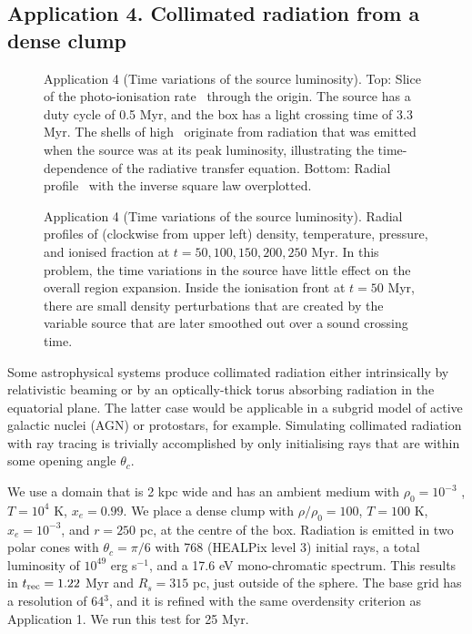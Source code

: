 \documentclass[useAMS,usenatbib]{mn2e}
\begin{document}
\subsection{Application 4. Collimated radiation from a dense clump}

\begin{figure}
  \caption{\label{fig:test12_kph} Application 4 (Time variations of the
    source luminosity).  Top: Slice of the photo-ionisation rate
    \kph~through the origin.  The source has a duty cycle of 0.5 Myr,
    and the box has a light crossing time of 3.3 Myr.  The shells of
    high \kph~originate from radiation that was emitted when the
    source was at its peak luminosity, illustrating the
    time-dependence of the radiative transfer equation.  Bottom:
    Radial profile \kph~with the inverse square law overplotted.}
\end{figure}

\begin{figure}
  \caption{\label{fig:test12_profiles} Application 4 (Time variations of the
    source luminosity).  Radial profiles of (clockwise from upper
    left) density, temperature, pressure, and ionised fraction at $t =
    50, 100, 150, 200, 250$ Myr.  In this problem, the time variations
    in the source have little effect on the overall \hii region
    expansion.  Inside the ionisation front at $t = 50$ Myr, there are
    small density perturbations that are created by the variable
    source that are later smoothed out over a sound crossing time.}
\end{figure}

Some astrophysical systems produce collimated radiation either
intrinsically by relativistic beaming or by an optically-thick torus
absorbing radiation in the equatorial plane.  The latter case would be
applicable in a subgrid model of active galactic nuclei (AGN) or
protostars, for example.  Simulating collimated radiation with ray
tracing is trivially accomplished by only initialising rays that are
within some opening angle $\theta_c$.

We use a domain that is 2 kpc wide and has an ambient medium with
$\rho_0 = 10^{-3}$ \cubecm, $T = 10^4$ K, $x_e = 0.99$.  We place a
dense clump with $\rho/\rho_0 = 100$, $T = 100$ K, $x_e = 10^{-3}$,
and $r = 250$ pc, at the centre of the box.  Radiation is emitted in
two polar cones with $\theta_c = \pi/6$ with 768 (HEALPix level 3)
initial rays, a total luminosity of $10^{49}$ erg s$^{-1}$, and a 17.6
eV mono-chromatic spectrum.  This results in $t_{\rm rec} = 1.22$ Myr
and $R_s = 315$ pc, just outside of the sphere.  The base grid has a
resolution of 64$^3$, and it is refined with the same overdensity
criterion as Application 1.  We run this test for 25 Myr.
\end{document}
